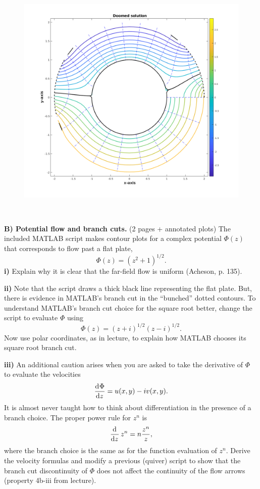 \documentclass{article}
\begin{document}
\begin{figure}
    \includegraphics[width=\textwidth]{doomed}
    \centering
\end{figure}

\

\newpage

\textbf{B) Potential flow and branch cuts.} (2 pages + annotated plots)
The included MATLAB script makes contour plots for a complex potential
$\Phi(z)$ that corresponds to flow past a flat plate,
%
\begin{equation*}
    \Phi(z) = (z^2 + 1)^{1/2}
    .
\end{equation*}
%
\textbf{i)} Explain why it is clear that the far-field flow is
uniform (Acheson, p. 135).

\textbf{ii)} Note that the script draws a thick black line representing
the flat plate. But, there is evidence in MATLAB's branch cut in the
``bunched'' dotted contours. To understand MATLAB's branch cut choice for
the square root better, change the script to evaluate $\Phi$ using
%
\begin{equation*}
    \Phi(z) = (z + i)^{1/2} (z - i)^{1/2}
    .
\end{equation*}
%
Now use polar coordinates, as in lecture, to explain how MATLAB chooses
its square root branch cut.

\textbf{iii)} An additional caution arises when you are asked to take
the derivative of $\Phi$ to evaluate the velocities
%
\begin{equation*}
    \dod{\Phi}{z} = u(x, y) - i v(x, y)
    .
\end{equation*}
%
It is almost never taught how to think about differentiation in the
presence of a branch choice. The proper power rule for $z^n$ is
%
\begin{equation*}
    \dod{}{z} z^n = n \frac{z^n}{z}
    ,
\end{equation*}
%
where the branch choice is the same as for the function evaluation of
$z^n$. Derive the velocity formulas and modify a previous (quiver)
script to show that the branch cut discontinuity of $\Phi$ does not
affect the continuity of the flow arrows (property 4b-iii from lecture).
\end{document}
